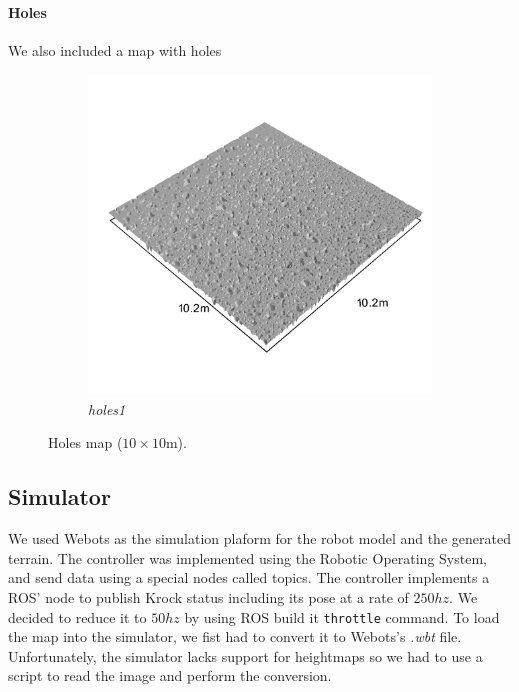 \documentclass[../document.tex]{subfiles}
\begin{document}
\paragraph{Holes} We also included a map with holes
\begin{figure}[htbp]
    \centering
        \begin{subfigure}[b]{0.32\textwidth}
            \includegraphics[width=\textwidth]{../img/hm3d_borders/holes1.png}
            \caption{\emph{holes1}}
        \end{subfigure}
\caption{Holes map ($10\times10$m).}
\end{figure}
\subsection{Simulator}
We used Webots as the simulation plaform for the robot model and the generated terrain. The controller was implemented using the Robotic Operating System, and send data using a special nodes called topics. The controller implements a ROS' node to publish Krock status including its pose at a rate of $250hz$. We decided to reduce it to $50hz$ by using ROS build it \texttt{throttle} command. 
To load the map into the simulator, we fist had to convert it to Webots's \emph{.wbt} file. Unfortunately, the simulator lacks support for heightmaps so we had to use a script to read the image and perform the conversion.
\end{document}
